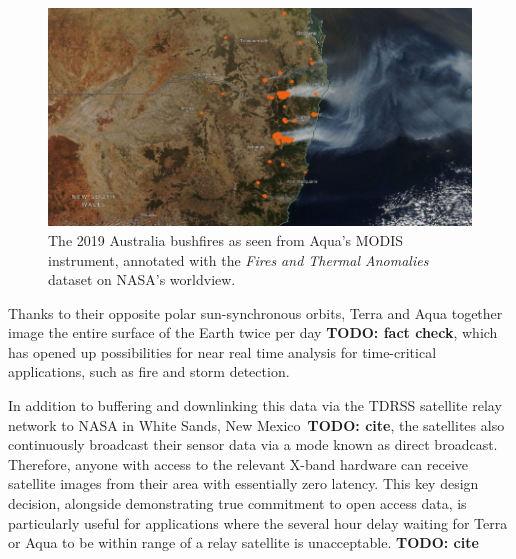\begin{figure}
    \centering
    \includegraphics[width=\columnwidth]{diagrams/bushfire.png}
    \caption{The 2019 Australia bushfires as seen from Aqua's MODIS instrument, annotated with the \textit{Fires and Thermal Anomalies} dataset on NASA's worldview.\protect\footnotemark}
    \label{fig:bushfire}
\end{figure}


Thanks to their opposite polar sun-synchronous orbits, Terra and Aqua together image the entire surface of the Earth twice per day \textbf{TODO: fact check}, which has opened up possibilities for near real time analysis for time-critical applications, such as fire and storm detection.

In addition to buffering and downlinking this data via the TDRSS satellite relay network to NASA in White Sands, New Mexico~\textbf{TODO: cite}, the satellites also continuously broadcast their sensor data via a mode known as direct broadcast.
Therefore, anyone with access to the relevant X-band hardware can receive satellite images from their area with essentially zero latency.
This key design decision, alongside demonstrating true commitment to open access data, is particularly useful for applications where the several hour delay waiting for Terra or Aqua to be within range of a relay satellite is unacceptable. \textbf{TODO: cite}

